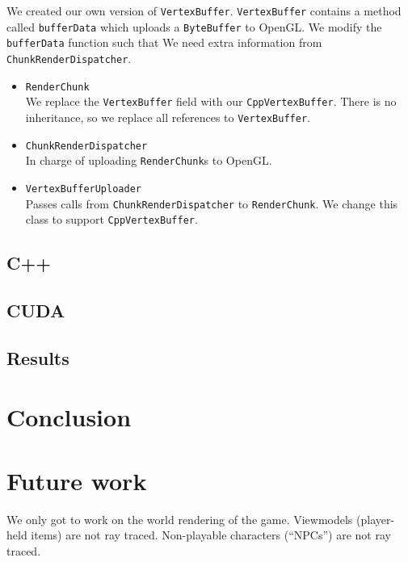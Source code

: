 \documentclass[]{article}
\begin{document}
We created our own version of \texttt{VertexBuffer}.
\texttt{VertexBuffer} contains a method called \texttt{bufferData} which uploads a \texttt{ByteBuffer} to OpenGL.
We modify the \texttt{bufferData} function such that 
We need extra information from \texttt{ChunkRenderDispatcher}.

\begin{itemize}
  \item \texttt{RenderChunk} \\
    We replace the \texttt{VertexBuffer} field with our \texttt{CppVertexBuffer}.
    There is no inheritance, so we replace all references to \texttt{VertexBuffer}.
  \item \texttt{ChunkRenderDispatcher} \\
    In charge of uploading \texttt{RenderChunk}s to OpenGL.
  \item \texttt{VertexBufferUploader} \\
  Passes calls from \texttt{ChunkRenderDispatcher} to \texttt{RenderChunk}.
  We change this class to support \texttt{CppVertexBuffer}.
  
\end{itemize}

\subsection{C++}

\subsection{CUDA}

\subsection{Results}

\section{Conclusion}

\section{Future work}
We only got to work on the world rendering of the game.
Viewmodels (player-held items) are not ray traced.
Non-playable characters (\enquote{NPCs}) are not ray traced.
\end{document}
